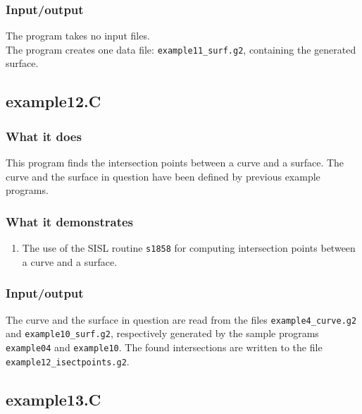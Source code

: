 \subsubsection{Input/output}
The program takes no input files.\\
The program creates one data file: \verb/example11_surf.g2/, containing the generated surface.

\subsection{example12.C}

\subsubsection{What it does}
This program finds the intersection points between a curve and a surface.  The curve and the 
surface in question have been defined by previous example programs.
\subsubsection{What it demonstrates}
\begin{enumerate}
\item The use of the SISL routine \verb/s1858/ for computing intersection points between a 
curve and a surface.
\end{enumerate}
\subsubsection{Input/output}
The curve and the surface in question are read from the files \verb/example4_curve.g2/ 
and \verb/example10_surf.g2/, respectively generated by the sample programs
\verb/example04/ and \verb/example10/.  The found intersections are written to
the file \\
\verb/example12_isectpoints.g2/.

\subsection{example13.C}

